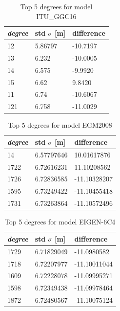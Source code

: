   \begin{table}[]
  	\centering
  	\caption{Top 5 degrees for model ITU\_GGC16}
  	\label{table:ggm_models}
  	\begin{tabular}{@{}lll@{}}
  		\toprule
  		\emph{degree} & std $\sigma$ [m]  & difference\\ \midrule
  		12 & 5.86797 &-10.7197\\
  		13 & 6.232&-10.0005\\
  		14 & 6.575&-9.9920\\
  		15 & 6.62&9.8420\\
  		11 & 6.74&-10.6067\\
  		121 & 6.758&-11.0029\\ \bottomrule  		
  	\end{tabular}
  \end{table}
  
    \begin{table}[]
    	\centering
    	\caption{Top 5 degrees for model EGM2008}
    	\label{table:ggm_models_egm2008}
    	\begin{tabular}{@{}lll@{}}
    		\toprule
    		\emph{degree} & std $\sigma$ [m]  & difference\\ \midrule
    		14 &6.57797646 &10.01617876\\
    		1722& 6.72616231& 11.10208562\\
    		1726 &6.72836585 &-11.10328207\\
    		1595 &6.73249422 &-11.10455418\\
    		1731 &6.73263864 &-11.10572496 \\ \bottomrule
    		
    	\end{tabular}
    \end{table}
    
    \begin{table}[]
    	\centering
    	\caption{Top 5 degrees for model EIGEN-6C4}
    	\label{table:ggm_models}
    	\begin{tabular}{@{}lll@{}}
    		\toprule
    		\emph{degree} & std $\sigma$ [m]  & difference\\ \midrule
    		
    		1729 &6.71829049 &-11.0980582\\
    		1718 &6.72207977 &-11.10011044\\
    		1609 &6.72228078 &-11.09995271\\
    		1598 &6.72349438 &-11.09978464\\
    		1872 & 6.72480567 & -11.10075124\\ \bottomrule
    		
    	\end{tabular}
    \end{table}
    
